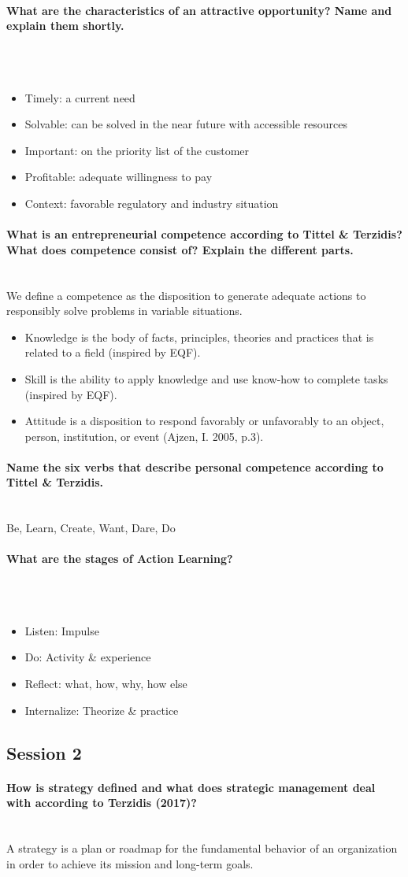 \documentclass[10pt,a4paper,noendnumber=true]{scrartcl}
\newcommand{\properparagraph}[1]{\paragraph{\textcolor{Emerald}{#1}}\mbox{}\\}
\begin{document}
\properparagraph{What are the characteristics of an attractive opportunity? Name and explain them shortly.}
\\[-6ex]
\begin{itemize}
	\item Timely: a current need
	\item Solvable: can be solved in the near future with accessible resources
	\item Important: on the priority list of the customer
	\item Profitable: adequate willingness to pay
	\item Context: favorable regulatory and industry situation
\end{itemize}

\properparagraph{What is an entrepreneurial competence according to Tittel \& Terzidis? What does competence consist of? Explain the different parts.}
We define a competence as the disposition to generate adequate actions to responsibly solve problems in variable situations.
\begin{itemize}
	\item Knowledge is the body of facts, principles, theories and 	practices that is related to a field (inspired by EQF).
	\item  Skill is the ability to apply knowledge and use know-how to complete tasks (inspired by EQF).
	\item  Attitude is a disposition to respond favorably or unfavorably to an object, person, institution, or event (Ajzen, I. 2005, p.3).
\end{itemize}

\properparagraph{Name the six verbs that describe personal competence according to Tittel \& Terzidis.}
Be, Learn, Create, Want, Dare, Do

\properparagraph{What are the stages of Action Learning?}
\\[-6ex]
\begin{itemize}
	\item Listen: Impulse
	\item Do: Activity \& experience
	\item Reflect: what, how, why, how else
	\item Internalize: Theorize \& practice
\end{itemize}









\newpage
\subsection{Session 2}
\properparagraph{How is strategy defined and what does strategic management deal with according to Terzidis (2017)?}
A strategy is a plan or roadmap for the fundamental behavior of an organization in order to achieve its mission and long-term goals.
\end{document}
